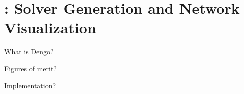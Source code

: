 \section{\dengo{}: Solver Generation and Network Visualization}


What is Dengo?

Figures of merit?

Implementation?
